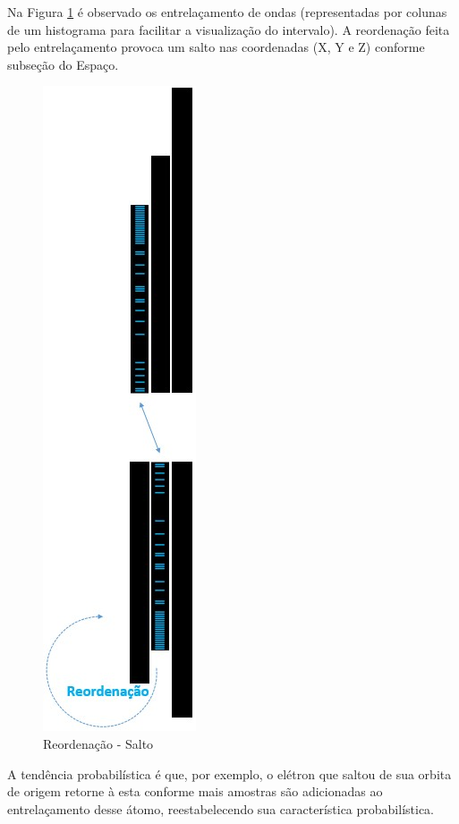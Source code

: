 Na Figura \ref{fig:consciousness_space_subconscious_observation_jump} é observado os entrelaçamento de ondas (representadas por colunas de um histograma para facilitar a visualização do intervalo). A reordenação feita pelo entrelaçamento provoca um salto nas coordenadas (X, Y e Z) conforme subseção do Espaço.
	\begin{figure}[H]
	\caption{Reordenação - Salto}
	\label{fig:consciousness_space_subconscious_observation_jump}
	\centering
	\includegraphics[scale=.55]{sections/images/consciousness_space_subconscious_observation_jump.jpg}
	\end{figure}

A tendência probabilística é que, por exemplo, o elétron que saltou de sua orbita de origem retorne à esta conforme mais amostras são adicionadas ao entrelaçamento desse átomo, reestabelecendo sua característica probabilística. 

